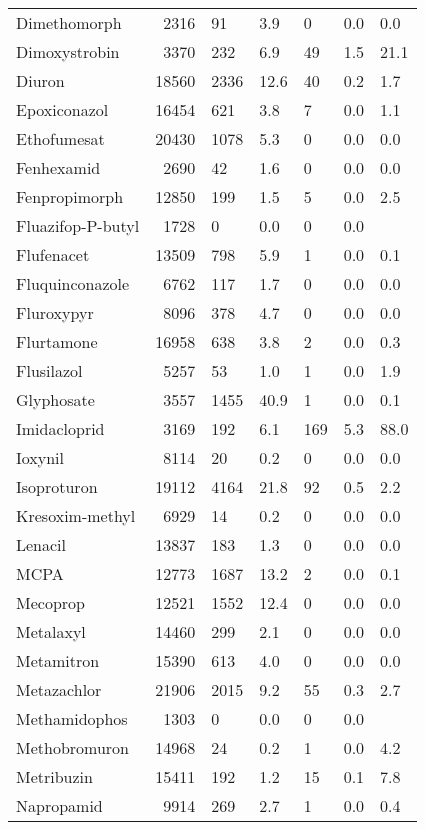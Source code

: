 \begin{longtable}{p{3cm}rR{1.4cm}R{1.4cm}R{1.4cm}R{1.4cm}R{1.4cm}}
  Dimethomorph & 2316 & 91 & 3.9 &  0 & 0.0 & 0.0 \\ 
  Dimoxystrobin & 3370 & 232 & 6.9 & 49 & 1.5 & 21.1 \\ 
  Diuron & 18560 & 2336 & 12.6 & 40 & 0.2 & 1.7 \\ 
  Epoxiconazol & 16454 & 621 & 3.8 &  7 & 0.0 & 1.1 \\ 
  Ethofumesat & 20430 & 1078 & 5.3 &  0 & 0.0 & 0.0 \\ 
  Fenhexamid & 2690 & 42 & 1.6 &  0 & 0.0 & 0.0 \\ 
  Fenpropimorph & 12850 & 199 & 1.5 &  5 & 0.0 & 2.5 \\ 
  Fluazifop-P-butyl & 1728 &  0 & 0.0 &  0 & 0.0 &  \\ 
  Flufenacet & 13509 & 798 & 5.9 &  1 & 0.0 & 0.1 \\ 
  Fluquinconazole & 6762 & 117 & 1.7 &  0 & 0.0 & 0.0 \\ 
  Fluroxypyr & 8096 & 378 & 4.7 &  0 & 0.0 & 0.0 \\ 
  Flurtamone & 16958 & 638 & 3.8 &  2 & 0.0 & 0.3 \\ 
  Flusilazol & 5257 & 53 & 1.0 &  1 & 0.0 & 1.9 \\ 
  Glyphosate & 3557 & 1455 & 40.9 &  1 & 0.0 & 0.1 \\ 
  Imidacloprid & 3169 & 192 & 6.1 & 169 & 5.3 & 88.0 \\ 
  Ioxynil & 8114 & 20 & 0.2 &  0 & 0.0 & 0.0 \\ 
  Isoproturon & 19112 & 4164 & 21.8 & 92 & 0.5 & 2.2 \\ 
  Kresoxim-methyl & 6929 & 14 & 0.2 &  0 & 0.0 & 0.0 \\ 
  Lenacil & 13837 & 183 & 1.3 &  0 & 0.0 & 0.0 \\ 
  MCPA & 12773 & 1687 & 13.2 &  2 & 0.0 & 0.1 \\ 
  Mecoprop & 12521 & 1552 & 12.4 &  0 & 0.0 & 0.0 \\ 
  Metalaxyl & 14460 & 299 & 2.1 &  0 & 0.0 & 0.0 \\ 
  Metamitron & 15390 & 613 & 4.0 &  0 & 0.0 & 0.0 \\ 
  Metazachlor & 21906 & 2015 & 9.2 & 55 & 0.3 & 2.7 \\ 
  Methamidophos & 1303 &  0 & 0.0 &  0 & 0.0 &  \\ 
  Methobromuron & 14968 & 24 & 0.2 &  1 & 0.0 & 4.2 \\ 
  Metribuzin & 15411 & 192 & 1.2 & 15 & 0.1 & 7.8 \\ 
  Napropamid & 9914 & 269 & 2.7 &  1 & 0.0 & 0.4 \\ 

\end{longtable}
